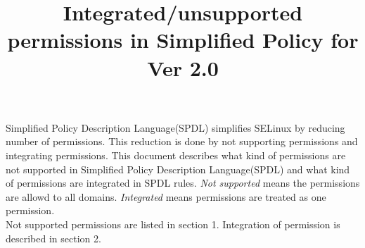 \documentclass{article}
\title{Integrated/unsupported permissions in Simplified Policy for Ver 2.0}
\begin{document}
\def\labelenumi{(\theenumi)}
\maketitle
\tableofcontents
\newpage
Simplified Policy Description Language(SPDL) simplifies SELinux by
reducing number of permissions. This reduction is done by not supporting
permissions and integrating permissions.
This document describes what kind of permissions are not supported in
Simplified Policy Description Language(SPDL) and what kind of
permissions are integrated in SPDL rules.
{\it Not supported } means the permissions are allowd to all domains.
{\it Integrated } means permissions are treated as one permission.\\
Not supported permissions are listed in section 1. Integration of
permission is described in section 2.
\end{document}
